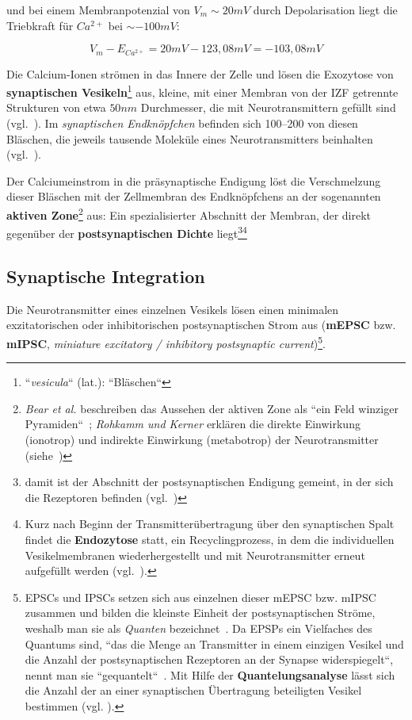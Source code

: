 {und bei einem Membranpotenzial von $V_m \sim 20 mV$ durch Depolarisation liegt die Triebkraft für $Ca^{2+}$ bei $\sim -100 mV$:

\begin{equation}
 V_m - E_{Ca^{2+}} = 20 mV - 123,08 mV = -103,08 mV
 \label{eq:gl-triebkraftca2}
\end{equation}


Die Calcium-Ionen strömen in das Innere der Zelle und lösen die Exozytose von \textbf{synaptischen Vesikeln}\footnote{
 ``\textit{vesicula}`` (lat.): ``Bläschen``
} aus, kleine, mit einer Membran von der IZF getrennte Strukturen von etwa $50 nm$ Durchmesser, die mit Neurotransmittern gefüllt sind (vgl.~\cite[1000]{BCP18}).
Im \textit{synaptischen Endknöpfchen} befinden sich 100--200 von diesen Bläschen, die jeweils tausende Moleküle eines Neurotransmitters beinhalten (vgl.~\cite[184]{KSJ+13}).

Der Calciumeinstrom in die präsynaptische Endigung löst die Verschmelzung dieser Bläschen mit der Zellmembran des Endknöpfchens an der sogenannten \textbf{aktiven Zone}\footnote{
 \textit{Bear et al.} beschreiben das Aussehen der aktiven Zone als ``ein Feld winziger Pyramiden``~\cite[123]{BCP18}; \textit{Rohkamm und Kerner} erklären die direkte Einwirkung (ionotrop) und indirekte Einwirkung (metabotrop) der Neurotransmitter (siehe~\cite[134]{RK18})
} aus: Ein spezialisierter Abschnitt der Membran, der direkt gegenüber der \textbf{postsynaptischen Dichte} liegt\footnote{
 damit ist der Abschnitt der postsynaptischen Endigung gemeint, in der sich die Rezeptoren befinden (vgl.~\cite[96]{HS19a})
}\footnote{
Kurz nach Beginn der Transmitterübertragung über den synaptischen Spalt findet die \textbf{Endozytose} statt, ein Recyclingprozess, in dem die individuellen Vesikelmembranen wiederhergestellt und mit Neurotransmitter erneut aufgefüllt werden (vgl.~\cite[133]{BCP18}).
}



\subsection{Synaptische Integration}

Die Neurotransmitter eines einzelnen Vesikels lösen einen minimalen exzitatorischen oder inhibitorischen postsynaptischen Strom aus (\textbf{mEPSC} bzw. \textbf{mIPSC}, \textit{miniature excitatory / inhibitory postsynaptic current})\footnote{
EPSCs und IPSCs setzen sich aus einzelnen dieser mEPSC bzw. mIPSC zusammen und bilden die kleinste Einheit der postsynaptischen Ströme, weshalb man sie als \textit{Quanten} bezeichnet~\cite[98]{HS19a}.
Da EPSPs ein Vielfaches des Quantums sind, ``das die Menge an Transmitter in einem einzigen Vesikel und die Anzahl der postsynaptischen Rezeptoren an der Synapse widerspiegelt``, nennt man sie ``gequantelt``~\cite[142]{BCP18}. Mit Hilfe der \textbf{Quantelungsanalyse} lässt sich die Anzahl der an einer synaptischen Übertragung beteiligten Vesikel bestimmen (vgl. \cite[142]{BCP18}).
}.

}
